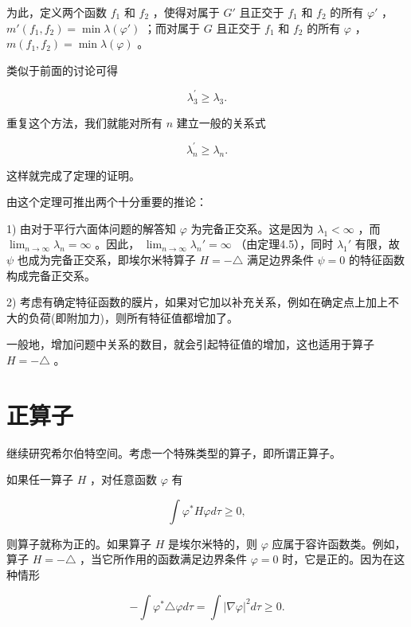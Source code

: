 为此，定义两个函数 $f_{1}$ 和 $f_{2}$ ，使得对属于 $G'$ 且正交于 $f_{1}$ 和 $f_{2}$ 的所有 $\varphi'$ ， $m'(f_1, f_2) = \min \lambda(\varphi')$ ；而对属于 $G$ 且正交于 $f_{1}$ 和 $f_{2}$ 的所有 $\varphi$ ， $m(f_1, f_2) = \min \lambda(\varphi)$ 。

类似于前面的讨论可得

\begin{equation*}
\lambda_ {3} ^ {\prime} \geqslant \lambda_ {3}.
\end{equation*}

重复这个方法，我们就能对所有 $n$ 建立一般的关系式

\begin{equation*}
\lambda_ {n} ^ {\prime} \geqslant \lambda_ {n}.
\end{equation*}

这样就完成了定理的证明。

由这个定理可推出两个十分重要的推论：

1) 由对于平行六面体问题的解答知 $\varphi$ 为完备正交系。这是因为 $\lambda_{1} < \infty$ ，而 $\lim_{n \to \infty} \lambda_{n} = \infty$ 。因此， $\lim_{n \to \infty} \lambda_{n}' = \infty$ （由定理4.5），同时 $\lambda_{1}'$ 有限，故 $\psi$ 也成为完备正交系，即埃尔米特算子 $H = -\triangle$ 满足边界条件 $\psi = 0$ 的特征函数构成完备正交系。

2) 考虑有确定特征函数的膜片，如果对它加以补充关系，例如在确定点上加上不大的负荷(即附加力)，则所有特征值都增加了。

一般地，增加问题中关系的数目，就会引起特征值的增加，这也适用于算子 $H = -\triangle$ 。

\section{正算子}

继续研究希尔伯特空间。考虑一个特殊类型的算子，即所谓正算子。

如果任一算子 $H$ ，对任意函数 $\varphi$ 有

\begin{equation*}
\int \varphi^ {*} H \varphi d \tau \geqslant 0,\tag{4.48}
\end{equation*}

则算子就称为正的。如果算子 $H$ 是埃尔米特的，则 $\varphi$ 应属于容许函数类。例如，算子 $H = -\triangle$ ，当它所作用的函数满足边界条件 $\varphi = 0$ 时，它是正的。因为在这种情形

\begin{equation*}
- \int \varphi^ {*} \triangle \varphi d \tau = \int | \nabla \varphi | ^ {2} d \tau \geqslant 0.
\end{equation*}

